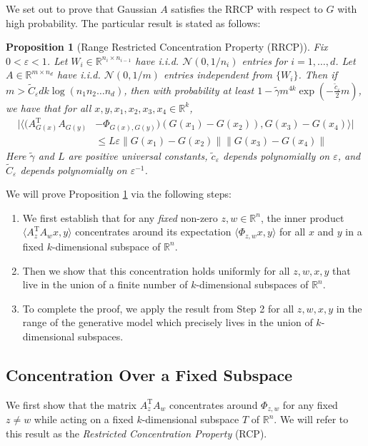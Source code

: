 \documentclass[11pt]{article}
\renewcommand{\epsilon}{\varepsilon}
\newcommand{\R}{\mathbb{R}}
\newcommand{\G}{G}
\renewcommand{\top}{{\mathrm{T}}}
\newtheorem{prop}{Proposition}
\theoremstyle{remark}
\begin{document}
We set out to prove that Gaussian $A$ satisfies the RRCP with respect to $\G$ with high probability. The particular result is stated as follows: \begin{prop}[Range Restricted Concentration Property (RRCP)] \label{realRRCP}
Fix $0 < \epsilon < 1$. Let $W_{i} \in \R^{n_i \times n_{i-1}}$ have i.i.d. $\mathcal{N}(0,1/n_i)$ entries for $i = 1,\dots,d$. Let $A \in \R^{m \times n_d}$ have i.i.d. $\mathcal{N}(0,1/m)$ entries independent from $\{W_i\}$. Then if $m > \tilde{C}_{\epsilon}dk \log (n_1n_2\dots n_d)$, then with probability at least $1 - \tilde{\gamma} m^{4k} \exp\left(- \frac{\tilde{c}_{\epsilon}}{2} m\right)$, we have that for all $x,y,x_1,x_2,x_3,x_4 \in \R^k$, \begin{align}
    |\langle (A_{\G(x)}^\top A_{\G(y)} & - \Phi_{\G(x),\G(y)})(\G(x_1) - \G(x_2)), \G(x_3)-\G(x_4)\rangle | \nonumber \\
    & \leqslant L\epsilon\|\G(x_1) - \G(x_2)\|\|\G(x_3)-\G(x_4)\| \nonumber
\end{align} Here $\tilde{\gamma}$ and $L$ are positive universal constants, $\tilde{c}_{\epsilon}$ depends polynomially on $\epsilon$, and $\tilde{C}_{\epsilon}$ depends polynomially on $\epsilon^{-1}$.
\end{prop}

We will prove Proposition \ref{realRRCP} via the following steps: \begin{enumerate}
    \item We first establish that for any \textit{fixed} non-zero $z,w \in \R^n$, the inner product $\langle A_z^\top A_wx,y\rangle$ concentrates around its expectation $\langle \Phi_{z,w}x,y\rangle$ for all $x$ and $y$ in a fixed $k$-dimensional subspace of $\R^n$.
    \item Then we show that this concentration holds uniformly for all $z,w,x,y$ that live in the union of a finite number of $k$-dimensional subspaces of $\R^n$.
    \item To complete the proof, we apply the result from Step 2 for all $z,w,x,y$ in the range of the generative model which precisely lives in the union of $k$-dimensional subspaces.
\end{enumerate}


\subsection{Concentration Over a Fixed Subspace}

We first show that the matrix $A_z^\top A_w$ concentrates around $\Phi_{z,w}$ for any fixed $z \neq w$ while acting on a fixed $k$-dimensional subspace $T$ of $\R^n$. We will refer to this result as the \textit{Restricted Concentration Property} (RCP).
\end{document}
